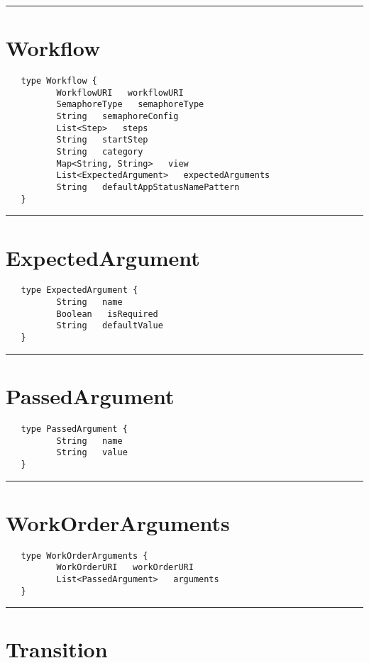 \rule{15cm}{2pt}
\section{Workflow}
\label{type:Workflow}

\begin{verbatim}
   type Workflow {
          WorkflowURI   workflowURI
          SemaphoreType   semaphoreType
          String   semaphoreConfig
          List<Step>   steps
          String   startStep
          String   category
          Map<String, String>   view
          List<ExpectedArgument>   expectedArguments
          String   defaultAppStatusNamePattern
   }
\end{verbatim}

\rule{15cm}{2pt}
\section{ExpectedArgument}
\label{type:ExpectedArgument}

\begin{verbatim}
   type ExpectedArgument {
          String   name
          Boolean   isRequired
          String   defaultValue
   }
\end{verbatim}

\rule{15cm}{2pt}
\section{PassedArgument}
\label{type:PassedArgument}

\begin{verbatim}
   type PassedArgument {
          String   name
          String   value
   }
\end{verbatim}

\rule{15cm}{2pt}
\section{WorkOrderArguments}
\label{type:WorkOrderArguments}

\begin{verbatim}
   type WorkOrderArguments {
          WorkOrderURI   workOrderURI
          List<PassedArgument>   arguments
   }
\end{verbatim}

\rule{15cm}{2pt}
\section{Transition}
\label{type:Transition}

